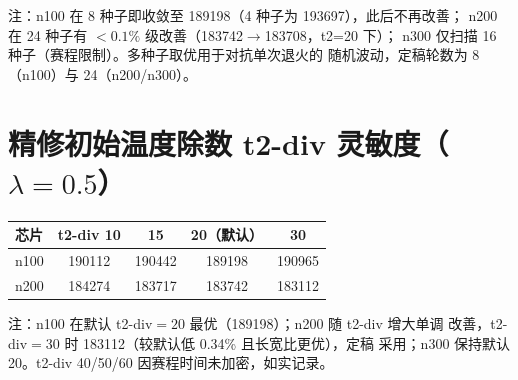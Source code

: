 \documentclass[12pt,a4paper]{article}
\begin{document}
注：n100 在 8 种子即收敛至 189198（4 种子为 193697），此后不再改善；
n200 在 24 种子有 $<0.1\%$ 级改善（183742$\to$183708，t2=20 下）；
n300 仅扫描 16 种子（赛程限制）。多种子取优用于对抗单次退火的
随机波动，定稿轮数为 8（n100）与 24（n200/n300）。

\section{精修初始温度除数 t2-div 灵敏度（$\lambda=0.5$）}

\begin{table}[H]
\centering
\scriptsize
\setlength{\tabcolsep}{3pt}
\begin{tabular}{lcccc}
\toprule
芯片 & t2-div 10 & 15 & 20（默认） & 30 \\
\midrule

n100 & 190112 & 190442 & 189198 & 190965 \\
n200 & 184274 & 183717 & 183742 & 183112 \\
\bottomrule
\end{tabular}
\end{table}

注：n100 在默认 t2-div$=20$ 最优（189198）；n200 随 t2-div 增大单调
改善，t2-div$=30$ 时 183112（较默认低 0.34\% 且长宽比更优），定稿
采用；n300 保持默认 20。t2-div 40/50/60 因赛程时间未加密，如实记录。
\end{document}

